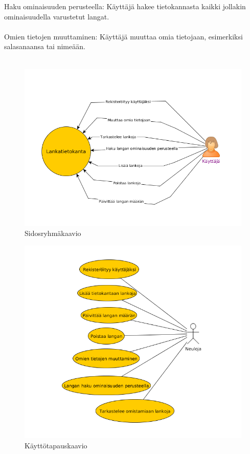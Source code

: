 \documentclass[12pt]{article}
\begin{document}
Haku ominaisuuden perusteella: Käyttäjä hakee tietokannasta kaikki jollakin ominaisuudella varustetut langat.
\\ \ \\
Omien tietojen muuttaminen: Käyttäjä muuttaa omia tietojaan, esimerkiksi salasanaansa tai nimeään.
\\ \ \\
\begin{figure}[!h]
\includegraphics[scale=0.5]{sidosryhmakaavio.png}
\caption{Sidosryhmäkaavio}
\end{figure}
\begin{figure}
\includegraphics[scale=0.5]{kayttotapaukset.png}
\caption{Käyttötapauskaavio}
\end{figure}
\end{document}
